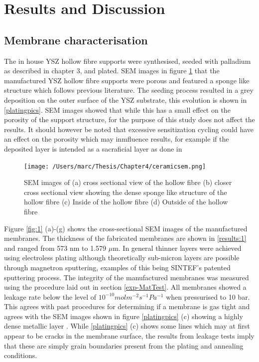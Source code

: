 \section{Results and Discussion}
\subsection{Membrane characterisation}

The in house YSZ hollow fibre supports were synthesised, seeded with palladium as described in chapter 3, and plated. SEM images in figure \ref{ceramicsem} that the manufactured YSZ hollow fibre supports were porous and featured a sponge like structure which follows previous literature. \cite{CHI2020117479} The seeding process resulted in a grey deposition on the outer surface of the YSZ substrate, this evolution is shown in \ref{platingpics}. SEM images showed that while this has a small effect on the porosity of the support structure, for the purpose of this study does not affect the results. It should however be noted that excessive sensitization cycling could have an effect on the porosity which may inmfluence results, for example if the deposited layer is intended as a sacraficial layer as done in \cite{CHI2020117479} 

\begin{figure}
    \centering
    \texttt{[image: /Users/marc/Thesis/Chapter4/ceramicsem.png]}
    \caption{SEM images of (a) cross sectional view of the hollow fibre (b) closer cross sectional view showing the dense sponge like structure of the hollow fibre (c) Inside of the hollow fibre (d) Outside of the hollow fibre}
    \label{ceramicsem}
\end{figure}


Figure \ref{fig:1} (a)-(g) shows the cross-sectional SEM images of the manufactured membranes.  The thickness of the fabricated membranes are shown in \ref{results:1} and ranged from 573 nm to 1.579 $\mu$m. In general thinner layers were achieved using electroless plating although theoretically sub-micron layers are possible through magnetron sputtering, examples of this being SINTEF’s patented sputtering process.\cite{Peters2011} The integrity of the manufactured membranes was measured using the procedure laid out in section \ref{exp-MatTest}. All membranes showed a leakage rate below the level of $10^{-10} mol m^{-2} s^{-1} Pa^{-1}$ when pressurised to 10 bar. This agrees with past procedures for determining if a membrane is gas tight and agrees with the SEM images shown in figure \ref{platingpics} (c) showing a highly dense metallic layer \cite{GouveiaGil2015} \cite{LI2015446}. While \ref{platingpics} (c) shows some lines which may at first appear to be cracks in the membrane surface, the results from leakage tests imply that these are simply grain boundaries present from the plating and annealing conditions. 


